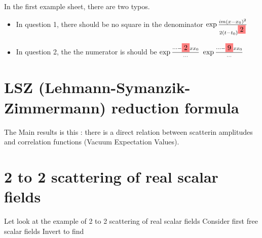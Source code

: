 \documentclass{article}
\begin{document}
\begin{remark}
In the first example sheet, there are two typos. 
\begin{itemize}
    \item In question 1, there should be no square in the denominator $\exp \frac{im(x-x_0)^2}{2(t-t_0)^{\highlight{2}}}$
    \item In question 2, the the numerator is should be $\exp\frac{\dots -\highlight{2}xx_0}{\dots}$  $\exp\frac{\dots -\highlight{9}xx_0}{\dots}$ 
\end{itemize}
\end{remark}

\section{LSZ (Lehmann-Symanzik-Zimmermann) reduction formula}

\begin{remark}
The Main results is this : there is a direct relation between scatterin amplitudes and correlation functions (Vacuum Expectation Values). 
\end{remark}

\section{2 to 2 scattering of real scalar fields}
Let look at the example of 2 to 2 scattering of real scalar fields
Consider first free scalar fields 
Invert to find 
\end{document}

